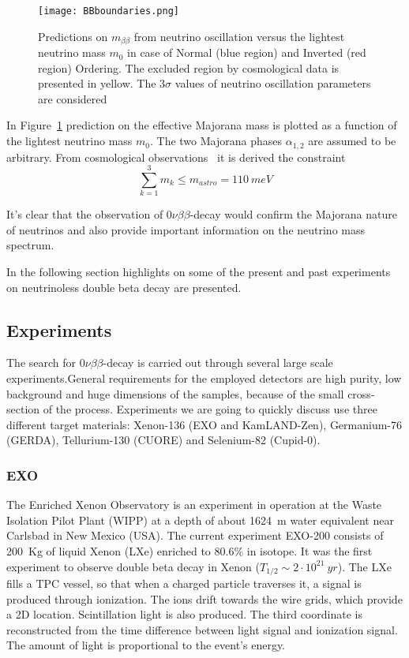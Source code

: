 \documentclass{subnucbo}
\begin{document}
\begin{figure}[h]
\centering
\texttt{[image: BBboundaries.png]}
\caption{Predictions on $m_{\beta\beta}$ from neutrino oscillation versus the lightest neutrino mass $m_0$ in case of Normal (blue region) and Inverted (red region) Ordering. The excluded region by cosmological data is presented in yellow. The $3\sigma$ values of neutrino oscillation parameters are considered~\cite{ref:ver}}
\label{fig:BBbound}
\end{figure}
In Figure~\ref{fig:BBbound} prediction on the effective Majorana mass is plotted as a function of the lightest neutrino mass $m_0$. The two Majorana phases $\alpha_{1,2}$ are assumed to be arbitrary. From cosmological observations~\cite{ref:ver} it is derived the constraint 
\begin{equation}
\sum_{k=1}^3m_k\leq m_{astro}=\SI{110}{meV}
\end{equation}

It's clear that the observation of $0\nu\beta\beta$-decay would confirm the Majorana nature of neutrinos and also provide important  information on the neutrino mass spectrum.

In the following section highlights on some of the present and past experiments on neutrinoless double beta decay are presented.

\subsection{Experiments}
The search for $0\nu\beta\beta$-decay is carried out through several large scale experiments.General requirements for the employed detectors are high purity, low background and huge dimensions of the samples, because of the small cross-section of the process.
Experiments we are going to quickly discuss use three different target materials: Xenon-136 (EXO and KamLAND-Zen), Germanium-76 (GERDA), Tellurium-130 (CUORE) and Selenium-82 (Cupid-0).

\subsubsection{EXO}
The Enriched Xenon Observatory is an experiment in operation at the Waste Isolation Pilot Plant (WIPP) at a depth of about \SI{1624}{m} water equivalent near Carlsbad in New Mexico (USA).
The current experiment EXO-200 consists of \SI{200}{Kg} of liquid Xenon (LXe) enriched to 80.6\% in  isotope.  It was the first experiment to observe double beta decay in Xenon ($T_{1/2}\sim 2\cdot10^{21}\SI{}{yr}$).
The LXe fills a TPC vessel, so that when a charged particle traverses it, a signal is produced through ionization. The ions drift towards the wire grids, which provide a 2D location. Scintillation light is also produced. The third coordinate is reconstructed from the time difference between light signal and ionization signal. The amount of light is proportional to the event's energy.
\end{document}
